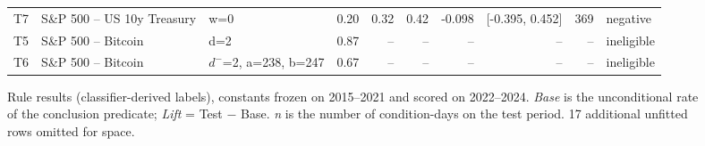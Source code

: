 \begin{figure}[t]
{\begin{tabular}{lllrrrrrrl}
T7 & S\&P 500 -- US 10y Treasury & w=0 & 0.20 & 0.32 & 0.42 & -0.098 & [-0.395, 0.452] & 369 & negative \\
T5 & S\&P 500 -- Bitcoin & d=2 & 0.87 & -- & -- & -- & -- & -- & ineligible \\
T6 & S\&P 500 -- Bitcoin & $d^-$=2, a=238, b=247 & 0.67 & -- & -- & -- & -- & -- & ineligible \\
\bottomrule
\end{tabular}
}
\caption{Rule results (classifier-derived labels), constants frozen on 2015--2021 and scored on 2022--2024. \emph{Base} is the unconditional rate of the conclusion predicate; \emph{Lift} = Test $-$ Base. \emph{n} is the number of condition-days on the test period. 17 additional unfitted rows omitted for space.}
\label{tab:rule-results_classifier-pub}
\end{figure}
